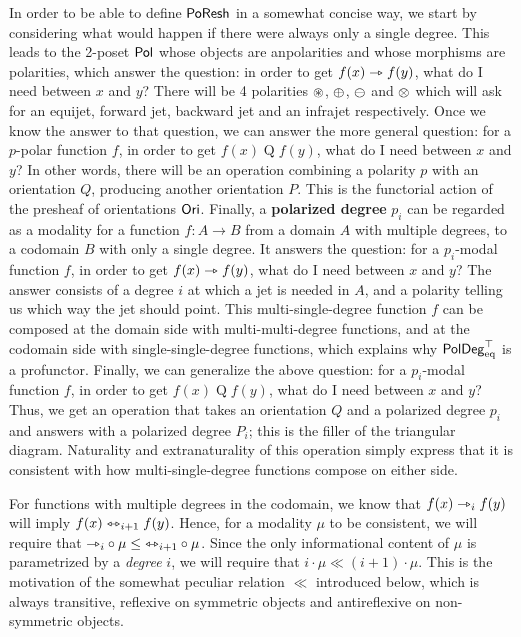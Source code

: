 \documentclass[a4paper]{memoir}
\begin{document}
In order to be able to define $\mathsf{PoResh}$ in a somewhat concise way, we start by considering what would happen if there were always only a single degree.
This leads to the 2-poset ${\mathsf{Pol}}$ whose objects are anpolarities and whose morphisms are polarities, which answer the question: in order to get $f(x) \rightarrowtriangle f(y)$, what do I need between $x$ and $y$?
There will be 4 polarities ${\oast}$, ${\oplus}$, ${\ominus}$ and ${\otimes}$ which will ask for an equijet, forward jet, backward jet and an infrajet respectively.
Once we know the answer to that question, we can answer the more general question: for a $p$-polar function $f$, in order to get $f(x) \mathrel{Q} f(y)$, what do I need between $x$ and $y$?
In other words, there will be an operation combining a polarity $p$ with an orientation $Q$, producing another orientation $P$. This is the functorial action of the presheaf of orientations ${\mathsf{Ori}}$.
Finally, a \textbf{polarized degree} $p_i$ can be regarded as a modality for a function $f : A \to B$ from a domain $A$ with multiple degrees, to a codomain $B$ with only a single degree. It answers the question: for a $p_i$-modal function $f$, in order to get $f(x) \rightarrowtriangle f(y)$, what do I need between $x$ and $y$?
The answer consists of a degree $i$ at which a jet is needed in $A$, and a polarity telling us which way the jet should point.
This multi-single-degree function $f$ can be composed at the domain side with multi-multi-degree functions, and at the codomain side with single-single-degree functions, which explains why $\mathsf{PolDeg}_{\mathrm{eq}}^\top$ is a profunctor.
Finally, we can generalize the above question: for a $p_i$-modal function $f$, in order to get $f(x) \mathrel{Q} f(y)$, what do I need between $x$ and $y$? Thus, we get an operation that takes an orientation $Q$ and a polarized degree $p_i$ and answers with a polarized degree $P_i$; this is the filler of the triangular diagram.
Naturality and extranaturality of this operation simply express that it is consistent with how multi-single-degree functions compose on either side.

For functions with multiple degrees in the codomain, we know that $f(x) \rightarrowtriangle_i f(y)$ will imply $f(x) \leftrightarrowtriangle_{i+1} f(y)$.
Hence, for a modality $\mu$ to be consistent, we will require that ${\rightarrowtriangle}_i \circ \mu \leq {\leftrightarrowtriangle}_{i+1} \circ \mu$.
Since the only informational content of $\mu$ is parametrized by a \emph{degree} $i$, we will require that $i \cdot \mu \ll (i+1) \cdot \mu$.
This is the motivation of the somewhat peculiar relation $\ll$ introduced below, which is always transitive, reflexive on symmetric objects and antireflexive on non-symmetric objects.
\end{document}
